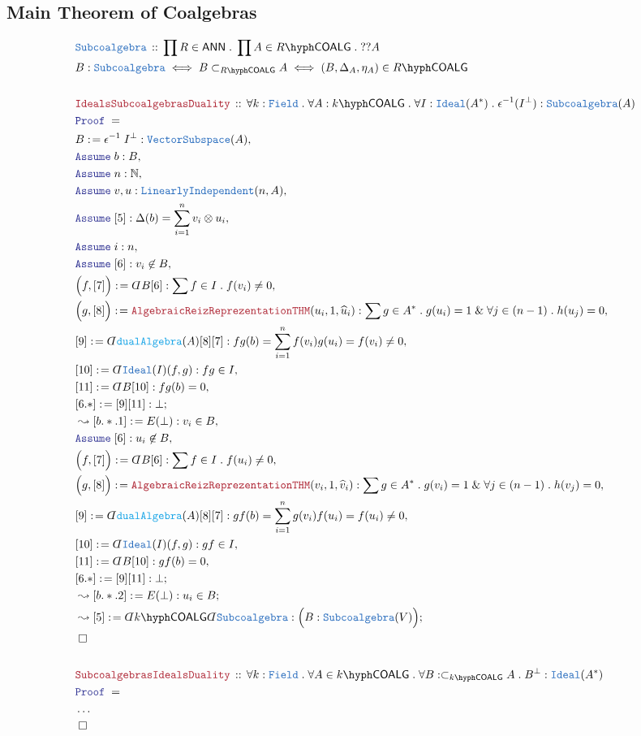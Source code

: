 \documentclass[12pt]{scrartcl}%
\newcommand{\TYPE}[1]{\textcolor{NavyBlue}{\mathtt{#1}}}%
\newcommand{\FUNC}[1]{\textcolor{Cerulean}{\mathtt{#1}}}%
\newcommand{\LOGIC}[1]{\textcolor{Blue}{\mathtt{#1}}}%
\newcommand{\THM}[1]{\textcolor{Maroon}{\mathtt{#1}}}%
\renewcommand{\.}{\; . \;} %
\newcommand{\de}{: \kern 0.1pc =} %
\newcommand{\Theorem}[2]{& \THM{#1} \, :: \, #2 \\ & \Proof = \\ } %
\newcommand{\DeclareType}[2]{& \TYPE{#1} \, :: \, #2 \\}%
\newcommand{\DefineNamedType}[4]{& #1 : \TYPE{#2} \iff #3 \iff #4 \\}%
\newcommand{\Page}[1]{ \begin{align*} #1 \end{align*}  }%
\newcommand{ \bd }{ \ByDef }%
\newcommand{\NoProof}{ & \ldots \\ \EndProof}%
\renewcommand{\And}{\; \& \;}%
\newcommand{\Nat}{\mathbb{N}}%
\newcommand{\Say}[3]{& #1 \de #2 : #3, \\} %
\newcommand{\Conclude}[3]{& #1 \de #2 : #3; \\}%
\newcommand{\Derive}[3]{& \leadsto #1 \de #2 : #3, \\} %
\newcommand{\DeriveConclude}[3]{& \leadsto #1 \de #2 : #3 ; \\} %
\newcommand{\Assume}[2]{& \LOGIC{Assume} \; #1 : #2, \\} %
\newcommand{\QED}{\; \square} %
\newcommand{\EndProof}{& \QED \\} %
\newcommand{\ByDef}{\rotatebox[origin=c]{-180}{$D$}}%
\newcommand{\Proof}{\LOGIC{Proof} \; } %
\newcommand{\LI}{\TYPE{LinearlyIndependent}}
\newcommand{\Field}{\TYPE{Field}}
\newcommand{\Ideal}{\TYPE{Ideal}}
\newcommand{\ANN}{\mathsf{ANN}} %
\newcommand{\COALG}[1]{#1\hyph\mathsf{COALG}}%
\begin{document}
\subsection{Main Theorem of Coalgebras}
\Page{
	\DeclareType{Subcoalgebra}{\prod R \in \ANN \. \prod A \in \COALG{R} \. ??A}
	\DefineNamedType{B}{Subcoalgebra}{B \subset_{\COALG{R}} A }{(B,\Delta_A,\eta_A) \in \COALG{R} }
	\\
	\Theorem{IdealsSubcoalgebrasDuality}{\forall k : \Field \. \forall A : \COALG{k} \. \forall I : \Ideal(A^*) \. \epsilon^{-1}(I^\bot) : \TYPE{Subcoalgebra}(A) }
	\Say{B}{\epsilon^{-1} \; I^\bot}{\TYPE{VectorSubspace}(A)}
	\Assume{b}{B}
	\Assume{n}{\Nat}
	\Assume{v,u}{\LI(n,A)}
	\Assume{[5]}{\Delta(b) = \sum^n_{i=1} v_i \otimes u_i}
	\Assume{i}{n}
	\Assume{[6]}{v_i \not \in B}
	\Say{\Big( f ,[7]\Big)}{ \bd B [6]}{\sum f \in I \. f(v_i) \neq 0}
	\Say{\Big(g,[8]\Big)}{\THM{AlgebraicReizReprezentationTHM}(u_i,1,\widehat{u}_i)}
	{
		\sum g \in A^* \. g(u_i) = 1 \And \forall j \in (n-1) \. h(u_j) = 0
	}
	\Say{[9]}{ \bd \FUNC{dualAlgebra}(A)[8][7]}{fg(b) = \sum^n_{i=1} f(v_i)g(u_i) = f(v_i) \neq 0}
	\Say{[10]}{\bd \Ideal(I)(f,g)}{ fg \in I }
	\Say{[11]}{ \bd B[10]  }{fg(b) = 0}
	\Conclude{[6.*]}{[9][11]}{\bot}
	\Derive{[b.*.1]}{E(\bot)}{v_i \in B}
	\Assume{[6]}{u_i \not \in B}
	\Say{\Big( f ,[7]\Big)}{ \bd B [6]}{\sum f \in I \. f(u_i) \neq 0}
	\Say{\Big(g,[8]\Big)}{\THM{AlgebraicReizReprezentationTHM}(v_i,1,\widehat{v}_i)}
	{
		\sum g \in A^* \. g(v_i) = 1 \And \forall j \in (n-1) \. h(v_j) = 0
	}
	\Say{[9]}{ \bd \FUNC{dualAlgebra}(A)[8][7]}{gf(b) = \sum^n_{i=1} g(v_i)f(u_i) = f(u_i) \neq 0}
	\Say{[10]}{\bd \Ideal(I)(f,g)}{ gf \in I }
	\Say{[11]}{ \bd B[10]  }{gf(b) = 0}
	\Conclude{[6.*]}{[9][11]}{\bot}
	\DeriveConclude{[b.*.2]}{E(\bot)}{u_i \in B}
	\DeriveConclude{[5]}{\bd \COALG{k}\bd \TYPE{Subcoalgebra}}{\Big( B : \TYPE{Subcoalgebra}(V) \Big) }
	\EndProof
	\\
	\Theorem{SubcoalgebrasIdealsDuality}{\forall k : \Field \. \forall A \in \COALG{k} \. \forall B : \subset_{\COALG{k}} A \. B^\bot : \Ideal(A^*) }
	\NoProof
	\\
}
\end{document}
